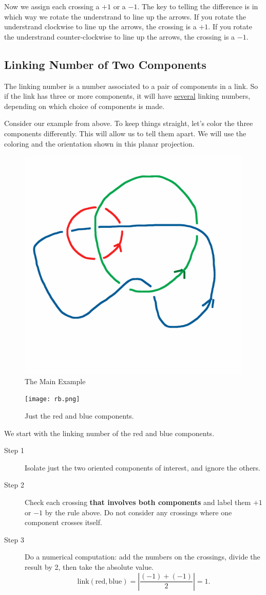 \documentclass[12pt,letterpaper]{article}
\theoremstyle{definition}
\begin{document}
Now we assign each crossing a $+1$ or a $-1$.
The key to telling the difference is in which way we rotate the understrand to line up the arrows.
If you rotate the understrand clockwise to line up the arrows, the crossing is a $+1$.
If you rotate the understrand counter-clockwise to line up the arrows, the crossing is a $-1$.

\subsection*{Linking Number of Two Components}

The linking number is a number associated to a pair of components in a link. 
So if the link has three or more components, it will have \underline{several} linking numbers, depending on which choice of components is made.

Consider our example from above.
To keep things straight, let's color the three components differently.
This will allow us to tell them apart.
We will use the coloring and the orientation shown in this planar projection.

\begin{figure}[h]
    \centering
    \includegraphics[width=.35\textwidth]{rgp11pics/mainex.png}
    \caption{The Main Example}
\end{figure}


\begin{figure}
    \centering
    \texttt{[image: rb.png]}
    \caption{Just the red and blue components.}
    \vspace{-60pt}
\end{figure}
We start with the linking number of the red and blue components.
\begin{description}
\item[Step 1] Isolate just the two oriented components of interest, and ignore the others.

\item[Step 2] Check each crossing \textbf{that involves both components} and label them $+1$ or $-1$ by the rule above. Do not consider any crossings where one component crosses itself.
\item[Step 3] Do a numerical computation: add the numbers on the crossings, divide the result by 2, then take the absolute value.
\[ 
\mathrm{link}(\text{red}, \text{blue}) = \left| \dfrac{(-1)+(-1)}{2}\right| = 1.
\]
\end{description}
\end{document}
